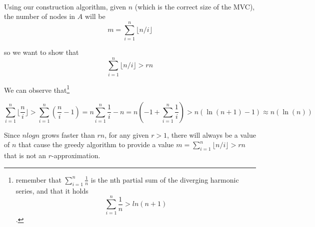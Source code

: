 \documentclass[a4paper]{article}
\begin{document}
\

Using our construction algorithm, given $n$ (which is the correct size of the MVC), the number of nodes in $A$ will be 
\[
m = \sum_{i=1}^n \lfloor n/i \rfloor
\]

so we want to show that 
\[
\sum_{i=1}^n \lfloor n/i \rfloor > rn
\]


We can observe that\footnote{remember that $\sum_{i=1}^n \frac{1}{n}$ is the nth partial sum of the diverging harmonic series, and that it holds
\[
\sum_{i=1}^n \frac{1}{n} > ln(n + 1)
\]
.}	

\[
\sum_{i=1}^n \lfloor \frac{n}{i} \rfloor > \sum_{i=1}^n (\frac{n}{i} - 1) = n \sum_{i=1}^n \frac{1}{i} - n = n(-1 + \sum_{i=1}^n \frac{1}{i}) > n(\ln{(n + 1)} - 1) \approx n(\ln{(n)})
\]

Since $nlogn$ grows faster than $rn$, for any given $r>1$, there will always be a value of $n$ that cause the greedy algorithm to provide a value $m = \sum_{i=1}^n \lfloor n/i \rfloor > rn$ that is not an $r$-approximation.
\end{document}
